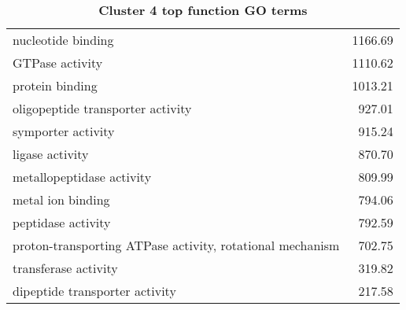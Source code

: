 \begin{table}[h]
\begin{center}
\begin{tabular}{p{}r}
nucleotide binding                                                                             & 1166.69                     \\
GTPase activity                                                                                & 1110.62                     \\
protein binding                                                                                & 1013.21                     \\
oligopeptide transporter activity                                                              & 927.01                      \\
symporter activity                                                                             & 915.24                      \\
ligase activity                                                                                & 870.70                      \\
metallopeptidase activity                                                                      & 809.99                      \\
metal ion binding                                                                              & 794.06                      \\
peptidase activity                                                                             & 792.59                      \\
proton-transporting ATPase activity, rotational mechanism                                      & 702.75                      \\
transferase activity                                                                           & 319.82                      \\
dipeptide transporter activity                                                                 & 217.58                      \\ \bottomrule
\end{tabular}
\end{center}

\caption[Cluster 4 top function GO terms]{\sf \textbf{Cluster 4 top function GO terms}}
\label{tab:cls4-function}
\end{table}